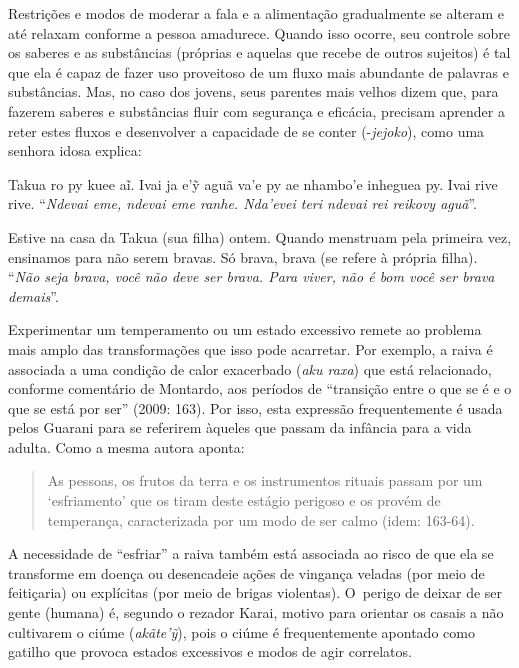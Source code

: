 Restrições e modos de moderar a fala e a alimentação gradualmente se
alteram e até relaxam conforme a pessoa amadurece. Quando isso ocorre,
seu controle sobre os saberes e as substâncias (próprias e aquelas que
recebe de outros sujeitos) é tal que ela é capaz de fazer uso
proveitoso de um fluxo mais abundante de palavras e substâncias. Mas,
no caso dos jovens, seus parentes mais velhos dizem que, para fazerem
saberes e substâncias fluir com segurança e eficácia, precisam aprender
a reter estes fluxos e desenvolver a capacidade de se conter (-\emph{jejoko}),
como uma senhora idosa explica:

\bigskip

\begin{paracol}{2}
\footnotesize
\bigskip
Takua ro py kuee aĩ. Ivai ja e'ỹ aguã va'e py ae nhambo'e inheguea py.
Ivai rive rive. ``\emph{Ndevai eme, ndevai eme ranhe. Nda'evei teri
ndevai rei reikovy aguã}''.

\switchcolumn
Estive na casa da Takua (sua filha) ontem. Quando menstruam pela
primeira vez, ensinamos para não serem bravas. Só brava, brava (se
refere à própria filha). ``\emph{Não seja brava, você não deve ser
brava. Para viver, não é bom você ser brava demais}''.
\end{paracol}

\bigskip

Experimentar um temperamento ou um estado excessivo remete ao problema
mais amplo das transformações que isso pode acarretar. Por exemplo, a
raiva é associada a uma condição de calor exacerbado (\emph{aku raxa}) que
está relacionado, conforme comentário de Montardo, aos períodos de
``transição entre o que se é e o que se está por ser'' (2009: 163). Por
isso, esta expressão frequentemente é usada pelos Guarani para se
referirem àqueles que passam da infância para a vida adulta. Como a
mesma autora aponta: 

\begin{quote}
\noindent
As pessoas, os frutos da terra e os instrumentos rituais passam por um
‘esfriamento’ que os tiram deste estágio perigoso e os provém de
temperança, caracterizada por um modo de ser calmo (idem: 163-64). 
\end{quote}


A necessidade de ``esfriar'' a raiva também está associada ao risco de que
ela se transforme em doença ou desencadeie ações de vingança veladas
(por meio de feitiçaria) ou explícitas (por meio de brigas violentas).
O~perigo de deixar de ser gente (humana) é, segundo o rezador Karai,
motivo para orientar os casais a não cultivarem o ciúme
(\emph{akãte’ỹ}), pois o ciúme é frequentemente apontado como gatilho
que provoca estados excessivos e modos de agir correlatos. 

